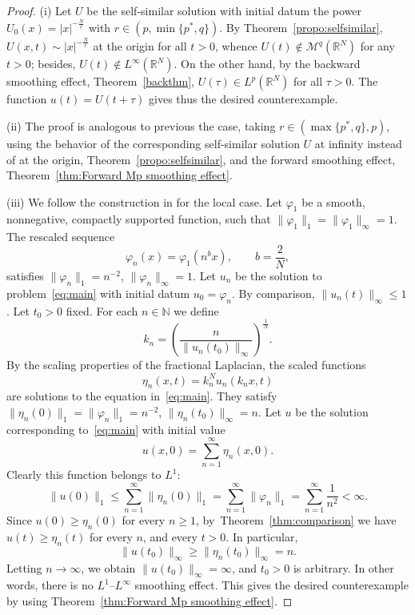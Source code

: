 \documentclass[leqno,12pt]{amsart}
\theoremstyle{definition}
\theoremstyle{remark}
\numberwithin{equation}{section}
\begin{document}
\begin{proof}

\noindent\textup{(i)} Let $U$ be the self-similar solution with initial datum the power $U_0(x)=|x|^{-\frac{N}{r}}$ with $r\in(p,\min\{p^*,q\})$. By Theorem~\ref{propo:selfsimilar},  $U(x,t)\sim|x|^{-\frac{N}{r}}$ at the origin for all $t>0$, whence $U(t)\not\in \mathcal{M}^q(\mathbb{R}^N)$ for any $t>0$; besides, $U(t)\not\in L^\infty(\mathbb{R}^N)$. On the other hand, by the backward smoothing effect, Theorem~\ref{backthm}, $U(\tau)\in L^p(\mathbb{R}^N)$ for all $\tau>0$. The function $u(t)=U(t+\tau)$ gives thus the desired counterexample.


\noindent\textup{(ii)}
The proof is analogous to previous the case, taking $r\in (\max\{p^*,q\},p)$, using  the behavior of the corresponding self-similar solution $U$ at infinity instead of at the origin, Theorem~\ref{propo:selfsimilar}, and the forward smoothing effect, Theorem~\ref{thm:Forward Mp smoothing effect}.


\noindent\textup{(iii)} We follow the construction in \cite{chasvaz} for the local case. Let $\varphi_1$ be a smooth, nonnegative, compactly supported function, such that $\|\varphi_1\|_{1}=\|\varphi_1\|_\infty=1$. The rescaled sequence
\[
    \varphi_n(x)=\varphi_1(n^bx),\qquad b=\frac{2}N,
\]
satisfies $\|\varphi_n\|_{1} = n^{-2}$, $\|\varphi_n\|_\infty=1$. Let \( u_n \) be the solution to problem~\eqref{eq:main} with initial datum $u_0=\varphi_n$. By comparison, $ \|u_n(t)\|_{\infty}\leq  1$. Let $t_0>0$ fixed. For each  $n\in\mathbb{N}$ we define
$$
    k_n=\left(\frac{n}{\|u_n(t_0)\|_\infty}\right)^\frac1N.
$$
By the scaling properties of the fractional Laplacian,  the scaled functions
\begin{equation*}\label{eq:star}
    \eta_n (x,t)= {k_n^{N}}u_n(k_nx,t)
\end{equation*}
are solutions to the equation in~\eqref{eq:main}. They satisfy $\|\eta_n(0)\|_{1}=\|\varphi_n\|_{1}=n^{-2}$, $\| \eta_n(t_0) \|_{\infty} = n$.
Let $u$ be the solution corresponding to~\eqref{eq:main} with initial value
$$
     u(x,0) = \sum_{n=1}^{\infty} \eta_n(x,0).
$$
Clearly this function belongs to $L^{1}$:
$$
   \| u(0)\|_{1}\le \sum_{n=1}^{\infty}\|\eta_n(0)\|_{1}=\sum_{n=1}^{\infty}\|\varphi_n\|_{1}= \sum_{n=1}^{\infty}\frac 1{n^2}<\infty.
$$
Since $u(0)\ge \eta_n(0)$ for every $n\ge1$,  by~Theorem~\ref{thm:comparison} we have
$u(t)\geq \eta_n(t)$
for every $n$, and every $t>0$. In particular,
$$
\|u(t_0)\|_{\infty} \ge \|\eta_n(t_0)\|_{\infty}=n.
$$
Letting $n\rightarrow\infty$, we obtain $\|u(t_0) \|_{\infty} =\infty$, and $t_0>0$ is arbitrary. In other words, there is no $L^{1} $--$L^\infty$ smoothing effect. This gives the desired counterexample by using 
Theorem~\ref{thm:Forward Mp smoothing effect}.
\end{proof}
\end{document}
